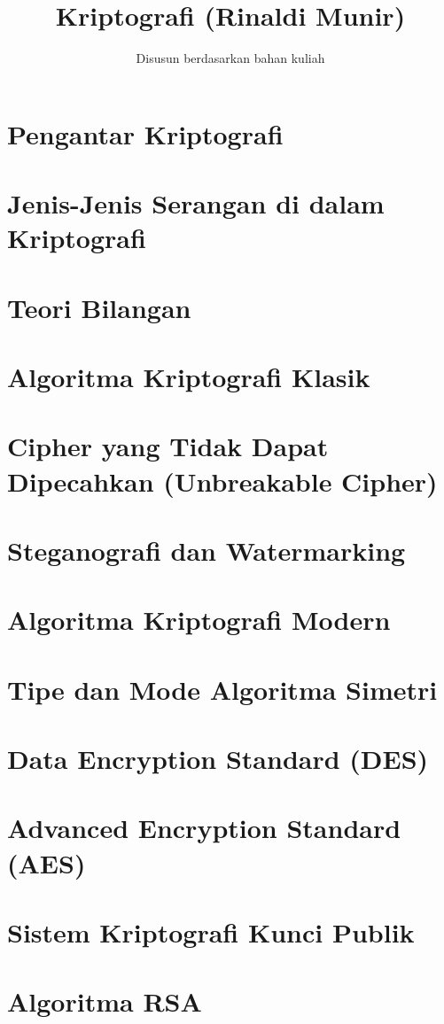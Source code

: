 \documentclass{book}
\title{Kriptografi (Rinaldi Munir)}
\author{Disusun berdasarkan bahan kuliah}
\date{}
\begin{document}
\maketitle

\tableofcontents

\chapter{Pengantar Kriptografi}
\chapter{Jenis-Jenis Serangan di dalam Kriptografi}
\chapter{Teori Bilangan}
\chapter{Algoritma Kriptografi Klasik}
\chapter{Cipher yang Tidak Dapat Dipecahkan (Unbreakable Cipher)}
\chapter{Steganografi dan Watermarking}
\chapter{Algoritma Kriptografi Modern}
\chapter{Tipe dan Mode Algoritma Simetri}
\chapter{Data Encryption Standard (DES)}
\chapter{Advanced Encryption Standard (AES)}
\chapter{Sistem Kriptografi Kunci Publik}
\chapter{Algoritma RSA}
\end{document}

